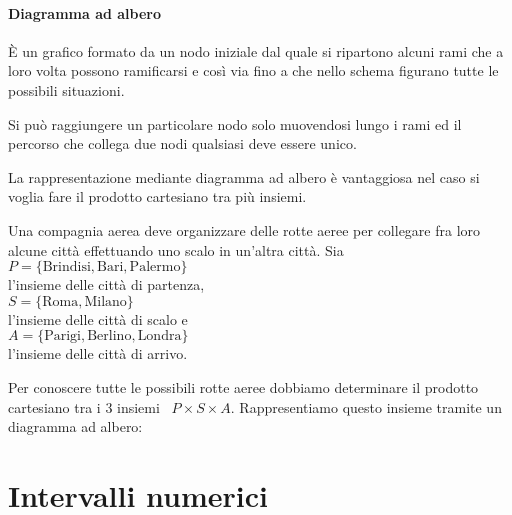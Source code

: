 {\begin{minipage}{.39 \textwidth}
\paragraph{Diagramma ad albero}
È un grafico formato da un nodo iniziale dal quale si ripartono alcuni
rami che a loro volta possono ramificarsi e così via fino a che nello
schema figurano tutte le possibili situazioni.

Si può raggiungere un particolare nodo solo muovendosi lungo i rami ed
il percorso che collega due nodi qualsiasi deve essere unico.

La rappresentazione mediante diagramma ad albero è vantaggiosa nel
caso si voglia fare il prodotto cartesiano tra più insiemi.
\end{minipage}

 
\begin{minipage}{.49 \textwidth}
 \begin{esempio}
Una compagnia aerea deve organizzare delle rotte aeree per collegare fra 
loro alcune città effettuando uno scalo in un'altra città.  Sia \\
\(P=\{\text{Brindisi},\text{Bari},\text{Palermo}\}\) \\
l'insieme delle città di partenza, \\
\(S=\{\text{Roma},\text{Milano}\}\) \\
l'insieme delle città di scalo e\\
\(A=\{\text{Parigi},\text{Berlino},\text{Londra}\}\) \\
l'insieme delle  città di arrivo. 

Per conoscere tutte le possibili rotte aeree dobbiamo
determinare il prodotto cartesiano tra i \(3\) insiemi~
\(P \times S \times A\).
Rappresentiamo questo insieme tramite un diagramma ad albero:
 \end{esempio}
\end{minipage}
\hfill
\begin{minipage}{.49 \textwidth}
\begin{center}

\end{center}
\end{minipage}

\section{Intervalli numerici}
\label{sec:insiemi_intervalli}

}
